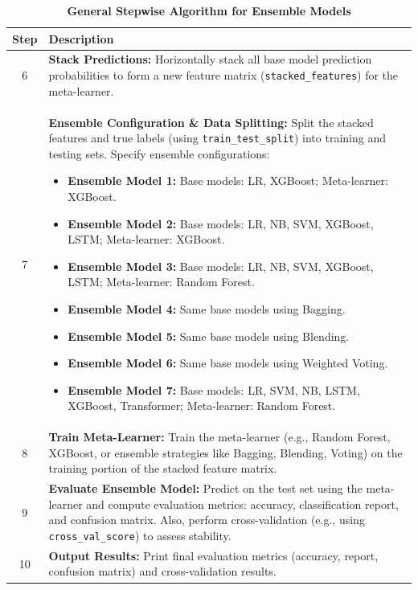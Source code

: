 \begin{table}[H]
    \caption*{\textbf{General Stepwise Algorithm for Ensemble Models}}
    \label{tab:ensemble_algorithm}
    \centering
    \renewcommand{\arraystretch}{1.3}
    \small
    \begin{tabularx}{\textwidth}{|c|X|}
        \hline
        \textbf{Step} & \textbf{Description} \\
        \hline
        6 & \textbf{Stack Predictions:} Horizontally stack all base model prediction probabilities to form a new feature matrix (\texttt{stacked\_features}) for the meta-learner. \\
        \hline
        7 & \textbf{Ensemble Configuration \& Data Splitting:} Split the stacked features and true labels (using \texttt{train\_test\_split}) into training and testing sets. Specify ensemble configurations:
              \begin{itemize}[noitemsep, topsep=0pt]
                  \item \textbf{Ensemble Model 1:} Base models: LR, XGBoost; Meta-learner: XGBoost.
                  \item \textbf{Ensemble Model 2:} Base models: LR, NB, SVM, XGBoost, LSTM; Meta-learner: XGBoost.
                  \item \textbf{Ensemble Model 3:} Base models: LR, NB, SVM, XGBoost, LSTM; Meta-learner: Random Forest.
                  \item \textbf{Ensemble Model 4:} Same base models using Bagging.
                  \item \textbf{Ensemble Model 5:} Same base models using Blending.
                  \item \textbf{Ensemble Model 6:} Same base models using Weighted Voting.
                  \item \textbf{Ensemble Model 7:} Base models: LR, SVM, NB, LSTM, XGBoost, Transformer; Meta-learner: Random Forest.
              \end{itemize} \\
        \hline
        8 & \textbf{Train Meta-Learner:} Train the meta-learner (e.g., Random Forest, XGBoost, or ensemble strategies like Bagging, Blending, Voting) on the training portion of the stacked feature matrix. \\
        \hline
        9 & \textbf{Evaluate Ensemble Model:} Predict on the test set using the meta-learner and compute evaluation metrics: accuracy, classification report, and confusion matrix. Also, perform cross-validation (e.g., using \texttt{cross\_val\_score}) to assess stability. \\
        \hline
        10 & \textbf{Output Results:} Print final evaluation metrics (accuracy, report, confusion matrix) and cross-validation results. \\
        \hline
    \end{tabularx}
\end{table}



